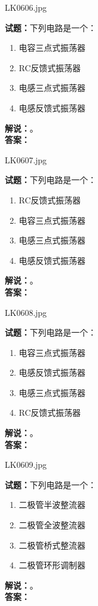 \documentclass{ctexbook}
\begin{document}
\vspace{\baselineskip}

LK0606.jpg

\noindent\textbf{试题：}下列电路是一个：
\begin{enumerate}[leftmargin=3em]
  \item 电容三点式振荡器
  \item RC反馈式振荡器
  \item 电感三点式振荡器
  \item 电感反馈式振荡器
\end{enumerate}
\noindent\textbf{解说：}\textbf{}。\\\noindent\textbf{答案：}

\vspace{\baselineskip}

LK0607.jpg

\noindent\textbf{试题：}下列电路是一个：
\begin{enumerate}[leftmargin=3em]
  \item RC反馈式振荡器
  \item 电容三点式振荡器
  \item 电感三点式振荡器
  \item 电感反馈式振荡器
\end{enumerate}
\noindent\textbf{解说：}\textbf{}。\\\noindent\textbf{答案：}

\vspace{\baselineskip}

LK0608.jpg

\noindent\textbf{试题：}下列电路是一个：
\begin{enumerate}[leftmargin=3em]
  \item 电容三点式振荡器
  \item 电感反馈式振荡器
  \item 电感三点式振荡器
  \item RC反馈式振荡器
\end{enumerate}
\noindent\textbf{解说：}\textbf{}。\\\noindent\textbf{答案：}

\vspace{\baselineskip}

LK0609.jpg

\noindent\textbf{试题：}下列电路是一个：
\begin{enumerate}[leftmargin=3em]
  \item 二极管半波整流器
  \item 二极管全波整流器
  \item 二极管桥式整流器
  \item 二极管环形调制器
\end{enumerate}
\noindent\textbf{解说：}\textbf{}。\\\noindent\textbf{答案：}
\end{document}
